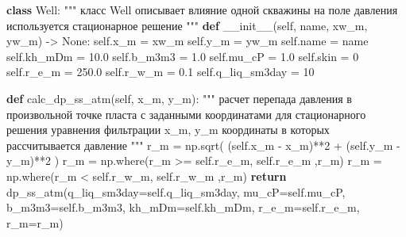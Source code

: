 \documentclass[
  russian,
  letterpaper,
  DIV=11,
  numbers=noendperiod,
  oneside]{scrartcl}
\newenvironment{Shaded}{\begin{snugshade}}{\end{snugshade}}
\newcommand{\CommentTok}[1]{\textcolor[rgb]{0.37,0.37,0.37}{#1}}
\newcommand{\ControlFlowTok}[1]{\textcolor[rgb]{0.00,0.23,0.31}{\textbf{#1}}}
\newcommand{\DecValTok}[1]{\textcolor[rgb]{0.68,0.00,0.00}{#1}}
\newcommand{\FloatTok}[1]{\textcolor[rgb]{0.68,0.00,0.00}{#1}}
\newcommand{\FunctionTok}[1]{\textcolor[rgb]{0.28,0.35,0.67}{#1}}
\newcommand{\KeywordTok}[1]{\textcolor[rgb]{0.00,0.23,0.31}{\textbf{#1}}}
\newcommand{\NormalTok}[1]{\textcolor[rgb]{0.00,0.23,0.31}{#1}}
\newcommand{\OperatorTok}[1]{\textcolor[rgb]{0.37,0.37,0.37}{#1}}
\newcommand{\VariableTok}[1]{\textcolor[rgb]{0.07,0.07,0.07}{#1}}
\begin{document}
\begin{Shaded}
\begin{Highlighting}[]
\KeywordTok{class}\NormalTok{ Well:}
    \CommentTok{"""}
\CommentTok{    класс Well описывает влияние одной скважины на поле давления}
\CommentTok{    используется стационарное решение}
\CommentTok{    """}
    \KeywordTok{def} \FunctionTok{\_\_init\_\_}\NormalTok{(}\VariableTok{self}\NormalTok{, name, xw\_m, yw\_m) }\OperatorTok{{-}\textgreater{}} \VariableTok{None}\NormalTok{:}
        \VariableTok{self}\NormalTok{.x\_m }\OperatorTok{=}\NormalTok{ xw\_m}
        \VariableTok{self}\NormalTok{.y\_m }\OperatorTok{=}\NormalTok{ yw\_m}
        \VariableTok{self}\NormalTok{.name }\OperatorTok{=}\NormalTok{ name}
        \VariableTok{self}\NormalTok{.kh\_mDm }\OperatorTok{=} \FloatTok{10.0}
        \VariableTok{self}\NormalTok{.b\_m3m3 }\OperatorTok{=} \FloatTok{1.0}
        \VariableTok{self}\NormalTok{.mu\_cP }\OperatorTok{=} \FloatTok{1.0}
        \VariableTok{self}\NormalTok{.skin }\OperatorTok{=} \DecValTok{0}
        \VariableTok{self}\NormalTok{.r\_e\_m }\OperatorTok{=} \FloatTok{250.0}
        \VariableTok{self}\NormalTok{.r\_w\_m }\OperatorTok{=} \FloatTok{0.1}
        \VariableTok{self}\NormalTok{.q\_liq\_sm3day }\OperatorTok{=} \DecValTok{10}       
        
    \KeywordTok{def}\NormalTok{ calc\_dp\_ss\_atm(}\VariableTok{self}\NormalTok{, x\_m, y\_m):}
        \CommentTok{"""}
\CommentTok{        расчет перепада давления в произвольной точке пласта }
\CommentTok{        с заданными координатами}
\CommentTok{        для стационарного решения уравнения фильтрации }
\CommentTok{        x\_m, y\_m координаты в которых рассчитывается давление}
\CommentTok{        """}
\NormalTok{        r\_m }\OperatorTok{=}\NormalTok{ np.sqrt( (}\VariableTok{self}\NormalTok{.x\_m }\OperatorTok{{-}}\NormalTok{ x\_m)}\OperatorTok{**}\DecValTok{2} \OperatorTok{+}\NormalTok{ (}\VariableTok{self}\NormalTok{.y\_m }\OperatorTok{{-}}\NormalTok{ y\_m)}\OperatorTok{**}\DecValTok{2}\NormalTok{ )}
\NormalTok{        r\_m }\OperatorTok{=}\NormalTok{ np.where(r\_m }\OperatorTok{\textgreater{}=} \VariableTok{self}\NormalTok{.r\_e\_m, }\VariableTok{self}\NormalTok{.r\_e\_m ,r\_m)}
\NormalTok{        r\_m }\OperatorTok{=}\NormalTok{ np.where(r\_m }\OperatorTok{\textless{}} \VariableTok{self}\NormalTok{.r\_w\_m, }\VariableTok{self}\NormalTok{.r\_w\_m ,r\_m)}
        \ControlFlowTok{return}\NormalTok{ dp\_ss\_atm(q\_liq\_sm3day}\OperatorTok{=}\VariableTok{self}\NormalTok{.q\_liq\_sm3day,}
\NormalTok{                          mu\_cP}\OperatorTok{=}\VariableTok{self}\NormalTok{.mu\_cP,}
\NormalTok{                          b\_m3m3}\OperatorTok{=}\VariableTok{self}\NormalTok{.b\_m3m3,}
\NormalTok{                          kh\_mDm}\OperatorTok{=}\VariableTok{self}\NormalTok{.kh\_mDm,}
\NormalTok{                          r\_e\_m}\OperatorTok{=}\VariableTok{self}\NormalTok{.r\_e\_m,}
\NormalTok{                          r\_m}\OperatorTok{=}\NormalTok{r\_m)}
    

\end{Highlighting}
\end{Shaded}
\end{document}
